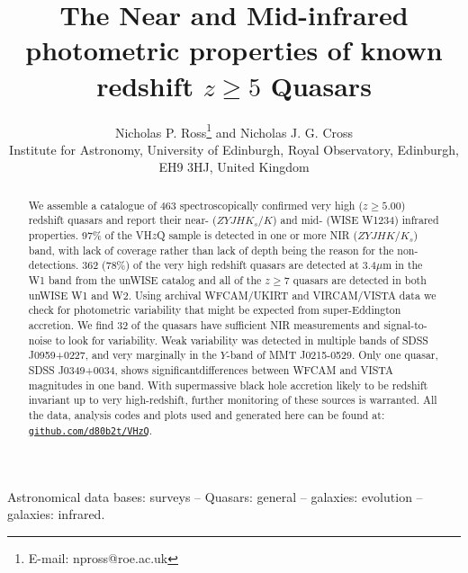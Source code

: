 \documentclass[usenatbib]{mnras}
\begin{document}
\title[Infrared properties of Very high-$z$ Quasars]
  {The Near and Mid-infrared photometric properties of known redshift $z\geq5$ Quasars}
\author[Ross \& Cross]
{Nicholas P. Ross\thanks{E-mail: npross@roe.ac.uk} and Nicholas J. G. Cross \\ 
Institute for Astronomy, University of Edinburgh, Royal Observatory, Edinburgh, EH9 3HJ, United Kingdom\\ }


\maketitle
\begin{abstract}
We assemble a catalogue of 463 spectroscopically confirmed very high
($z\geq5.00$) redshift quasars and report their near- ($ZYJHK_{s}/K$)
and mid- (WISE W1234) infrared properties. 97\% of the VH$z$Q sample
is detected in one or more NIR ($ZYJHK/K_{s}$) band, with lack of
coverage rather than lack of depth being the reason for the
non-detections. 362 (78\%) of the very high redshift quasars are
detected at 3.4$\mu$m in the W1 band from the unWISE catalog and all
of the $z\geq7$ quasars are detected in both unWISE W1 and W2. Using
archival WFCAM/UKIRT and VIRCAM/VISTA data we check for photometric
variability that might be expected from super-Eddington accretion. We
find 32 of the quasars have sufficient NIR measurements and
signal-to-noise to look for variability. Weak variability was detected
in multiple bands of SDSS J0959+0227, and very marginally in the
$Y$-band of MMT J0215-0529. Only one quasar, SDSS J0349+0034, shows
significantdifferences between WFCAM and VISTA magnitudes in one band.
With supermassive black hole accretion likely to be redshift invariant
up to very high-redshift, further monitoring of these sources is
warranted.  All the data, analysis codes and plots used and generated
here can be found at:
\href{https://github.com/d80b2t/VHzQ}{\tt github.com/d80b2t/VHzQ}.
\end{abstract}


\begin{keywords}
Astronomical data bases: surveys -- 
Quasars: general -- 
galaxies: evolution -- 
galaxies: infrared.
\end{keywords}



\end{document}
